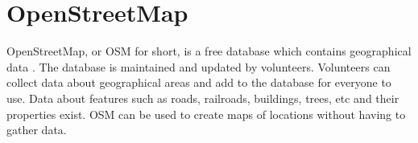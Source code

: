 \section{OpenStreetMap}
    OpenStreetMap, or OSM for short, is a free database which contains geographical data \cite{open-street-map}. The database is maintained and updated by volunteers. Volunteers can collect data about geographical areas and add to the database for everyone to use. Data about features such as roads, railroads, buildings, trees, etc and their properties exist. OSM can be used to create maps of locations without having to gather data.